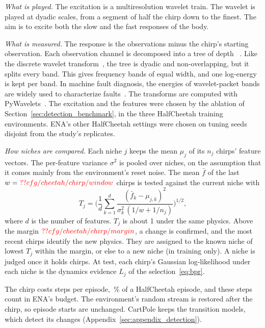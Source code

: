 \textit{What is played.} The excitation is a multiresolution wavelet train. The  wavelet is played at dyadic scales, from a segment of half the chirp down to the finest. The aim is to excite both the slow and the fast responses of the body.

\textit{What is measured.} The response is the observations minus the chirp's starting observation. Each observation channel is decomposed into a   tree of depth ~\citep{coifman1992entropy}. Like the discrete wavelet transform~\citep{mallat1989theory}, the tree is dyadic and non-overlapping, but it splits every band. This gives  frequency bands of equal width, and one log-energy is kept per band. In machine fault diagnosis, the energies of wavelet-packet bands are widely used to characterize faults~\citep{yan2014wavelets}. The transforms are computed with PyWavelets~\citep{lee2019pywavelets}. The excitation and the features were chosen by the ablation of Section~\ref{sec:detection_benchmark}, in the three HalfCheetah training environments. ENA's other HalfCheetah settings were chosen on tuning seeds disjoint from the study's replicates.

\textit{How niches are compared.} Each niche $j$ keeps the mean $\mu_j$ of its $n_j$ chirps' feature vectors. The per-feature variance $\sigma^2$ is pooled over niches, on the assumption that it comes mainly from the environment's reset noise. The mean $\bar{f}$ of the last $w = \Res{cfg/cheetah/chirp/window}$ chirps is tested against the current niche with
\begin{equation}
T_j = \Bigg(\frac{1}{d}\sum_{k=1}^{d} \frac{(\bar{f}_k - \mu_{j,k})^2}{\sigma_k^2\,(1/w + 1/n_j)}\Bigg)^{1/2},
\label{eq:chirp}
\end{equation}
where $d$ is the number of features. $T_j$ is about 1 under the same physics. Above the margin $\Res{cfg/cheetah/chirp/margin}$, a change is confirmed, and the most recent chirps identify the new physics. They are assigned to the known niche of lowest $T_j$ within the margin, or else to a new niche (in training only). A niche is judged once it holds  chirps. At test, each chirp's Gaussian log-likelihood under each niche is the dynamics evidence $L_j$ of the selection~\eqref{eq:bpr}.

The chirp costs  steps per episode, \,\% of a HalfCheetah episode, and these steps count in ENA's budget. The environment's random stream is restored after the chirp, so episode starts are unchanged. CartPole keeps the transition models, which detect its changes (Appendix~\ref{sec:appendix_detection}).

